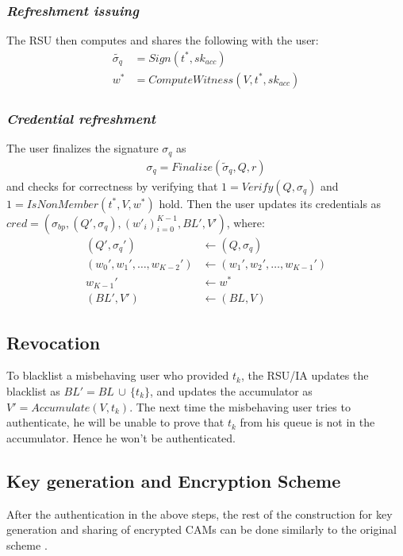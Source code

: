 \documentclass[12pt]{article}
\begin{document}
\subsubsection*{\textit{Refreshment issuing}}\vspace*{-2mm}
The RSU then computes and shares the following with the user:
\begin{align}
	\tilde{\sigma_q} &= Sign(t^*, sk_{acc}) \\ 
	w^* &= ComputeWitness(V, t^*, sk_{acc})
\end{align}


\subsubsection*{\textit{Credential refreshment}}\vspace*{-2mm}
The user finalizes the signature $\sigma_q$ as 
\begin{align}
	\sigma_q = Finalize(\tilde{\sigma}_q, Q, r)
\end{align}
and checks for correctness by verifying that $1 = Verify(Q, \sigma_q)$ and $1 = IsNonMember (t^*, V, w^*)$ hold. Then the user updates its credentials as $cred = (\sigma_{bp}, (Q', \sigma_q), (w'_i)_{i=0}^{K-1}, BL', V')$, where:
\begin{align*}
	(Q', \sigma_q') &\leftarrow (Q, \sigma_q)\\
	(w_0', w_1', \dots, w_{K-2}') &\leftarrow (w_1', w_2', \dots, w_{K-1}')\\
	w_{K-1}' &\leftarrow w^*\\
	(BL', V') &\leftarrow (BL, V)
\end{align*}


\subsection{Revocation}
To blacklist a misbehaving user who provided $t_k$, the RSU/IA updates the blacklist as $BL' = BL\,\cup\,\{ t_k \}$, and updates the accumulator as $V' = Accumulate(V, t_k)$.
The next time the misbehaving user tries to authenticate, he will be unable to prove that $t_k$ from his queue is not in the accumulator. Hence he won't be authenticated.


\subsection{Key generation and Encryption Scheme}
After the authentication in the above steps, the rest of the construction for key generation and sharing of encrypted CAMs can be done similarly to the original scheme \cite*{Kanchan}.
\end{document}
